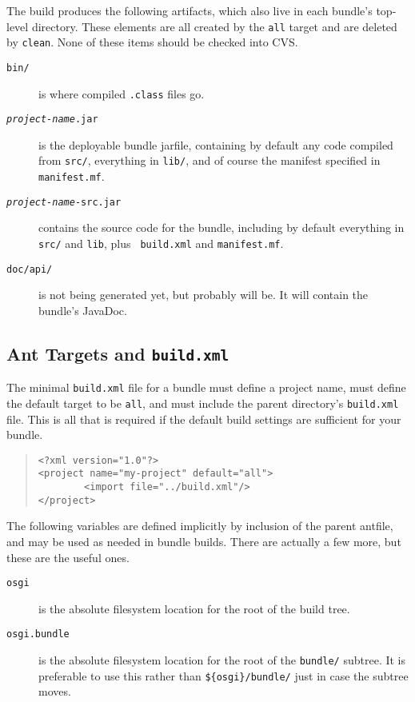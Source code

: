 \documentclass{report}
\begin{document}
The build produces the following artifacts, which also live in each bundle's top-level
directory. These elements are all created by the {\tt all} target and are deleted
by {\tt clean}. None of these items should be checked into CVS.

\begin{description}
\item[\tt bin/] is where compiled {\tt .class} files go.
\item[\tt {\it project-name}.jar] is the deployable bundle jarfile, containing by 
default any code compiled from {\tt src/}, everything in {\tt lib/}, and of 
course the manifest specified in {\tt manifest.mf}.
\item[\tt {\it project-name}-src.jar] contains the source code for the bundle, 
including by default everything in {\tt src/} and {\tt lib}, plus {\tt 
build.xml} and {\tt manifest.mf}.
\item[\tt doc/api/] is not being generated yet, but probably will be. It will contain
the bundle's JavaDoc.
\end{description}

\subsection{Ant Targets and {\tt build.xml}}
\label{bundle-ant}
The minimal {\tt build.xml} file for a bundle must define a project name, must 
define the default target to be {\tt all}, and must include the parent 
directory's {\tt build.xml} file. This is all that is required if the default 
build settings are sufficient for your bundle.

\begin{quote}\begin{scriptsize}\begin{verbatim}
<?xml version="1.0"?>
<project name="my-project" default="all">
        <import file="../build.xml"/>
</project>
\end{verbatim}\end{scriptsize}\end{quote}

The following variables are defined implicitly by inclusion of the parent
antfile, and may be used as needed in bundle builds. There are actually a few 
more, but these are the useful ones.

\begin{description}
\item[\tt osgi] is the absolute filesystem location for the root of the build tree.
\item[\tt osgi.bundle] is the absolute filesystem location for the root of the {\tt bundle/}
subtree. It is preferable to use this rather than {\tt \$\{osgi\}/bundle/}
just in case the subtree moves.
\end{description}
\end{document}
